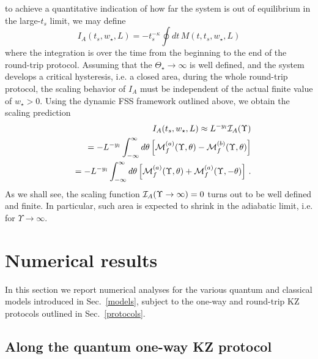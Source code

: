 to achieve a quantitative indication of how far the system is out of
equilibrium in the large-$t_s$ limit, we may define~\cite{PV-16}
\begin{equation}
  I_A(t_s,w_\star,L) = - t_s^{-\kappa} \oint dt\, M(t,t_s,w_\star,L)
\label{aharea}
\end{equation}
where the integration is over the time from the beginning to the end
of the round-trip protocol.  Assuming that the $\Theta_\star\to\infty$
is well defined, and the system develops a critical hysteresis, i.e. a
closed area, during the whole round-trip protocol, the scaling
behavior of $I_A$ must be independent of the actual finite value of
$w_\star>0$. Using the dynamic FSS framework outlined above, we obtain
the scaling prediction
\begin{eqnarray}
&&  I_A(t_s,w_\star,L) \approx L^{-y_l} {\cal I}_A(\Upsilon)   
\label{IAsca}\\
&& = - L^{-y_l} 
  \int_{-\infty}^\infty 
  d\theta \left[ {\cal M}_f^{(a)}(\Upsilon,\theta) -
  {\cal M}_f^{(b)}(\Upsilon,\theta)\right]
  \nonumber\\
  && = - L^{-y_l} 
  \int_{-\infty}^\infty 
  d\theta \left[{\cal M}_f^{(a)}(\Upsilon,\theta) +
  {\cal M}_f^{(a)}(\Upsilon,-\theta)\right]\,.
  \nonumber
\end{eqnarray}
As we shall see, the scaling function ${\cal I}_A(\Upsilon\to\infty)=
0$ turns out to be well defined and finite.
In particular, such area
is expected to shrink in the adiabatic limit, i.e. for
$\Upsilon\to\infty$.

  
\section{Numerical results}
\label{numresrotrip}

In this section we report numerical analyses for the various quantum
and classical models introduced in Sec.~\ref{models}, subject to the
one-way and round-trip KZ protocols outlined in Sec.~\ref{protocols}.



\subsection{Along the quantum one-way KZ protocol}
\label{qoneway}



